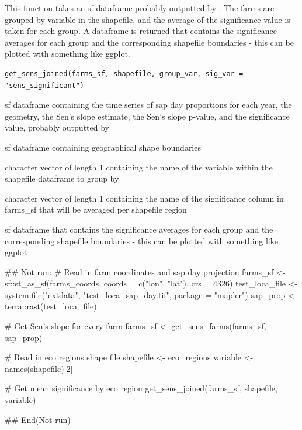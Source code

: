 %
\begin{Description}
This function takes an sf dataframe probably outputted by .
The farms are grouped by variable in the shapefile, and the average of the
significance value is taken for each group. A dataframe is returned that
contains the significance averages for each group and the corresponding
shapefile boundaries - this can be plotted with something like ggplot.
\end{Description}
%
\begin{Usage}
\begin{verbatim}
get_sens_joined(farms_sf, shapefile, group_var, sig_var = "sens_significant")
\end{verbatim}
\end{Usage}
%
\begin{Arguments}
\begin{ldescription}
\item[\code{farms\_sf}] sf dataframe containing the time series of sap day
proportions for each year, the geometry, the Sen's slope estimate,
the Sen's slope p-value, and the significance value,
probably outputted by 

\item[\code{shapefile}] sf dataframe containing geographical shape boundaries

\item[\code{group\_var}] character vector of length 1 containing the name of the
variable within the shapefile dataframe to group by

\item[\code{sig\_var}] character vector of length 1 containing the name of the
significance column in farms\_sf that will be averaged per shapefile region
\end{ldescription}
\end{Arguments}
%
\begin{Value}
sf dataframe that contains the significance averages for each group
and the corresponding shapefile boundaries - this can be plotted with
something like ggplot
\end{Value}
%
\begin{Examples}
\begin{ExampleCode}
## Not run: 
# Read in farm coordinates and sap day projection
farms_sf <- sf::st_as_sf(farms_coords, coords = c("lon", "lat"), crs = 4326)
test_loca_file <- system.file("extdata", "test_loca_sap_day.tif",
                              package = "mapler")
sap_prop <- terra::rast(test_loca_file)

# Get Sen's slope for every farm
farms_sf <- get_sens_farms(farms_sf, sap_prop)

# Read in eco regions shape file
shapefile <- eco_regions
variable <- names(shapefile)[2]

# Get mean significance by eco region
get_sens_joined(farms_sf, shapefile, variable)

## End(Not run)
\end{ExampleCode}
\end{Examples}
